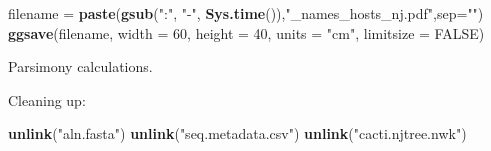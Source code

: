 \documentclass[
]{article}
\newenvironment{Shaded}{\begin{snugshade}}{\end{snugshade}}
\newcommand{\DataTypeTok}[1]{\textcolor[rgb]{0.13,0.29,0.53}{#1}}
\newcommand{\DecValTok}[1]{\textcolor[rgb]{0.00,0.00,0.81}{#1}}
\newcommand{\KeywordTok}[1]{\textcolor[rgb]{0.13,0.29,0.53}{\textbf{#1}}}
\newcommand{\NormalTok}[1]{#1}
\newcommand{\OtherTok}[1]{\textcolor[rgb]{0.56,0.35,0.01}{#1}}
\newcommand{\StringTok}[1]{\textcolor[rgb]{0.31,0.60,0.02}{#1}}
\begin{document}
\begin{Shaded}
\begin{Highlighting}[]
\NormalTok{filename =}\StringTok{ }\KeywordTok{paste}\NormalTok{(}\KeywordTok{gsub}\NormalTok{(}\StringTok{":"}\NormalTok{, }\StringTok{"-"}\NormalTok{, }\KeywordTok{Sys.time}\NormalTok{()),}\StringTok{"_names_hosts_nj.pdf"}\NormalTok{,}\DataTypeTok{sep=}\StringTok{""}\NormalTok{)}
\KeywordTok{ggsave}\NormalTok{(filename, }\DataTypeTok{width =} \DecValTok{60}\NormalTok{, }\DataTypeTok{height =} \DecValTok{40}\NormalTok{, }\DataTypeTok{units =} \StringTok{"cm"}\NormalTok{, }\DataTypeTok{limitsize =} \OtherTok{FALSE}\NormalTok{)}
\end{Highlighting}
\end{Shaded}

Parsimony calculations.

Cleaning up:

\begin{Shaded}
\begin{Highlighting}[]
\KeywordTok{unlink}\NormalTok{(}\StringTok{"aln.fasta"}\NormalTok{)}
\KeywordTok{unlink}\NormalTok{(}\StringTok{"seq.metadata.csv"}\NormalTok{)}
\KeywordTok{unlink}\NormalTok{(}\StringTok{"cacti.njtree.nwk"}\NormalTok{)}
\end{Highlighting}
\end{Shaded}
\end{document}
